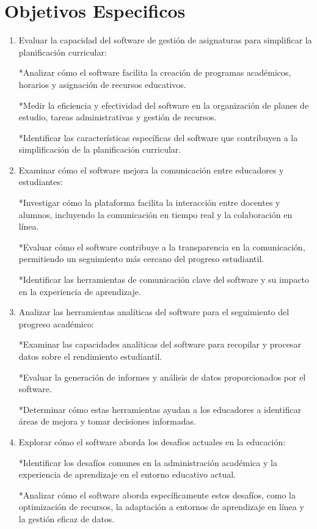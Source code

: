 \documentclass[11pt]{article}
\begin{document}
\section{Objetivos Especificos}
\begin{enumerate}
\item Evaluar la capacidad del software de gestión de asignaturas para simplificar la planificación curricular:

*Analizar cómo el software facilita la creación de programas académicos, horarios y asignación de recursos educativos.

*Medir la eficiencia y efectividad del software en la organización de planes de estudio, tareas administrativas y gestión de recursos.

*Identificar las características específicas del software que contribuyen a la simplificación de la planificación curricular.

\item Examinar cómo el software mejora la comunicación entre educadores y estudiantes:

*Investigar cómo la plataforma facilita la interacción entre docentes y alumnos, incluyendo la comunicación en tiempo real y la colaboración en línea.

*Evaluar cómo el software contribuye a la transparencia en la comunicación, permitiendo un seguimiento más cercano del progreso estudiantil.

*Identificar las herramientas de comunicación clave del software y su impacto en la experiencia de aprendizaje.

\item Analizar las herramientas analíticas del software para el seguimiento del progreso académico:

*Examinar las capacidades analíticas del software para recopilar y procesar datos sobre el rendimiento estudiantil.

*Evaluar la generación de informes y análisis de datos proporcionados por el software.

*Determinar cómo estas herramientas ayudan a los educadores a identificar áreas de mejora y tomar decisiones informadas.

\item Explorar cómo el software aborda los desafíos actuales en la educación:

*Identificar los desafíos comunes en la administración académica y la experiencia de aprendizaje en el entorno educativo actual.


*Analizar cómo el software aborda específicamente estos desafíos, como la optimización de recursos, la adaptación a entornos de
aprendizaje en línea y la gestión eficaz de datos.



\end{enumerate}
\end{document}
